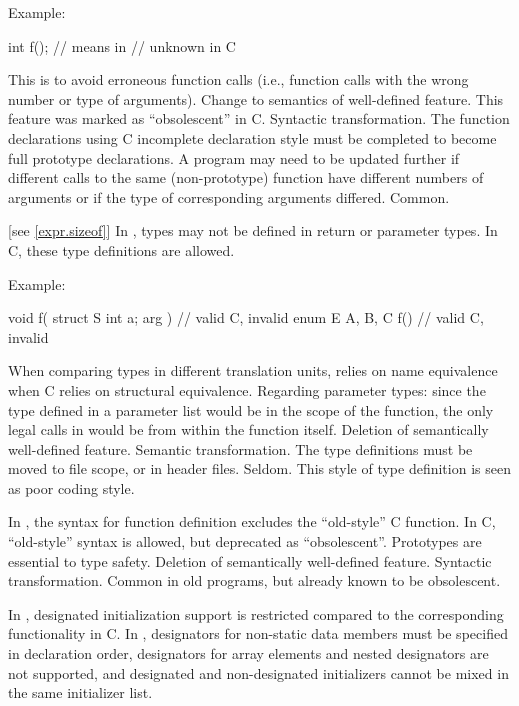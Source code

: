 Example:

\begin{codeblock}
int f();            // means    in \Java{}
                    //  unknown \tcode{)} in C
\end{codeblock}

\rationale
This is to avoid erroneous function calls (i.e., function calls
with the wrong number or type of arguments).
\effect
Change to semantics of well-defined feature.
This feature was marked as ``obsolescent'' in C.
\difficulty
Syntactic transformation.
The function declarations using C incomplete declaration style must
be completed to become full prototype declarations.
A program may need to be updated further if different calls to the
same (non-prototype) function have different numbers of arguments or
if the type of corresponding arguments differed.
\howwide
Common.

 [see \ref{expr.sizeof}]
\change In \Java{}, types may not be defined in return or parameter types.
In C, these type definitions are allowed.

Example:

\begin{codeblock}
void f( struct S { int a; } arg ) {}    // valid C, invalid \Java{}
enum E { A, B, C } f() {}               // valid C, invalid \Java{}
\end{codeblock}

\rationale
When comparing types in different translation units, \Java{} relies
on name equivalence when C relies on structural equivalence.
Regarding parameter types: since the type defined in a parameter list
would be in the scope of the function, the only legal calls in \Java{}
would be from within the function itself.
\effect
Deletion of semantically well-defined feature.
\difficulty
Semantic transformation.
The type definitions must be moved to file scope, or in header files.
\howwide
Seldom.
This style of type definition is seen as poor coding style.

\change In \Java{}, the syntax for function definition excludes the ``old-style'' C function.
In C, ``old-style'' syntax is allowed, but deprecated as ``obsolescent''.
\rationale
Prototypes are essential to type safety.
\effect
Deletion of semantically well-defined feature.
\difficulty
Syntactic transformation.
\howwide
Common in old programs, but already known to be obsolescent.

\change
In \Java{}, designated initialization support is restricted
compared to the corresponding functionality in C.
In \Java{},
designators for non-static data members
must be specified in declaration order,
designators for array elements and nested designators
are not supported,
and
designated and non-designated initializers
cannot be mixed in the same initializer list.

